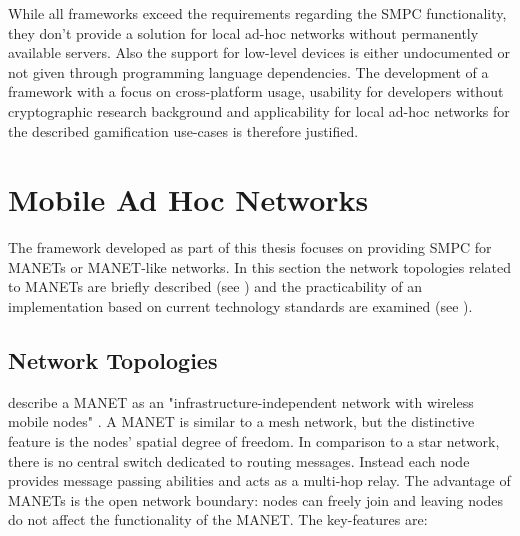 
While all frameworks exceed the requirements regarding the \gls{SMPC} functionality, they don't provide a solution for local ad-hoc networks without permanently available servers. Also the support for low-level devices is either undocumented or not given through programming language dependencies.
The development of a framework with a focus on cross-platform usage, usability for developers without cryptographic research background and applicability for local ad-hoc networks for the described gamification use-cases is therefore justified.

\FloatBarrier

\section{Mobile Ad Hoc Networks} \label{Mobile Ad Hoc Networks}
The framework developed as part of this thesis focuses on providing \gls{SMPC} for \glspl{MANET} or \gls{MANET}-like networks. In this section the network topologies related to \glspl{MANET} are briefly described (see ) and the practicability of an implementation based on current technology standards are examined (see ).

\subsection{Network Topologies} \label{Network Topologies}

\begingroup 
\sloppy
\textcite{Dorri2015} describe a \gls{MANET} as an "infrastructure-in\-de\-pen\-dent network with wireless mobile nodes" \autocite[p. 15]{Dorri2015}. A \gls{MANET} is similar to a mesh network, but the distinctive feature is the nodes' spatial degree of freedom. In comparison to a star network, there is no central switch dedicated to routing messages. Instead each node provides message passing abilities and acts as a multi-hop relay.
\endgroup
The advantage of \glspl{MANET} is the open network boundary: nodes can freely join and leaving nodes do not affect the functionality of the \gls{MANET}. The key-features are:

